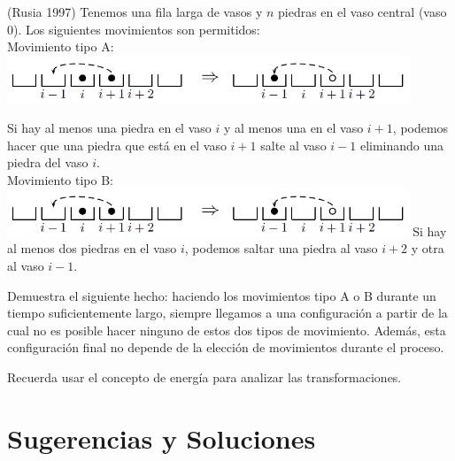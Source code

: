 \documentclass[11pt]{scrartcl}
\begin{document}
\begin{problem}
(Rusia 1997) Tenemos una fila larga de vasos y \( n \) piedras en el vaso central (vaso 0). Los siguientes movimientos son permitidos:\\
Movimiento tipo A:
\includegraphics[width=12cm]{images/clase_12_cuerpo_1.png}

Si hay al menos una piedra en el vaso \( i \) y al menos una en el vaso \( i + 1 \), podemos hacer que una piedra que está en el vaso \( i + 1 \) salte al vaso \( i - 1 \) eliminando una piedra del vaso \( i \).\\

Movimiento tipo B:
\includegraphics[width=12cm]{images/clase_12_cuerpo_1.png}
Si hay al menos dos piedras en el vaso \( i \), podemos saltar una piedra al vaso \( i + 2 \) y otra al vaso \( i - 1 \).

Demuestra el siguiente hecho: haciendo los movimientos tipo A o B durante un tiempo suficientemente largo, siempre llegamos a una configuración a partir de la cual no es posible hacer ninguno de estos dos tipos de movimiento. Además, esta configuración final no depende de la elección de movimientos durante el proceso.
\begin{hint}
Recuerda usar el concepto de energía para analizar las transformaciones.
\end{hint}
\end{problem}


\section{Sugerencias y Soluciones}
\begin{enumerate}

\end{enumerate}
\end{document}
